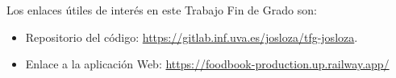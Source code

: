 \label{anexoenlaces}
Los enlaces útiles de interés en este Trabajo Fin de Grado son:

\begin{itemize}
    \item Repositorio del código: \url{https://gitlab.inf.uva.es/josloza/tfg-josloza}.
    \item Enlace a la aplicación Web: \url{https://foodbook-production.up.railway.app/}

\end{itemize}
 
